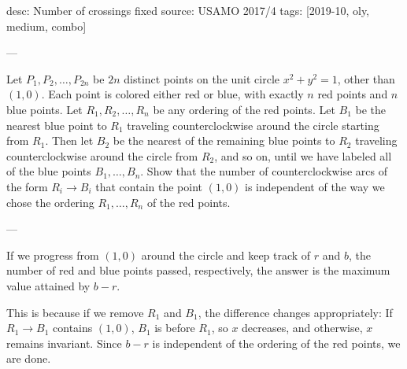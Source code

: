 desc: Number of crossings fixed
source: USAMO 2017/4
tags: [2019-10, oly, medium, combo]

---

Let $P_1,P_2,\ldots,P_{2n}$ be $2n$ distinct points on the unit circle $x^2+y^2=1$, other than $(1,0)$. Each point is colored either red or blue, with exactly $n$ red points and $n$ blue points. Let $R_1,R_2,\ldots,R_n$ be any ordering of the red points. Let $B_1$ be the nearest blue point to $R_1$ traveling counterclockwise around the circle starting from $R_1$. Then let $B_2$ be the nearest of the remaining blue points to $R_2$ traveling counterclockwise around the circle from $R_2$, and so on, until we have labeled all of the blue points $B_1,\ldots,B_n$. Show that the number of counterclockwise arcs of the form $R_i\to B_i$ that contain the point $(1,0)$ is independent of the way we chose the ordering $R_1,\ldots,R_n$ of the red points.

---

If we progress from $(1,0)$ around the circle and keep track of $r$ and $b$, the number of red and blue points passed, respectively, the answer is the maximum value attained by $b-r$.

This is because if we remove $R_1$ and $B_1$, the difference changes appropriately: If $R_1\to B_1$ contains $(1,0)$, $B_1$ is before $R_1$, so $x$ decreases, and otherwise, $x$ remains invariant. Since $b-r$ is independent of the ordering of the red points, we are done.
